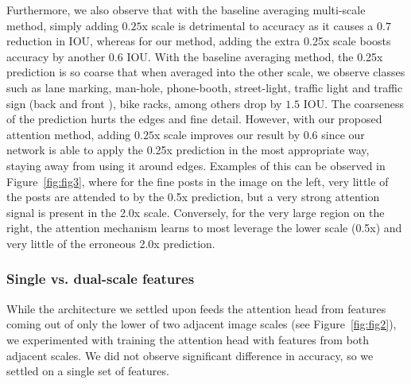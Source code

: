 \documentclass{article}
\begin{document}
Furthermore, we also observe that with the baseline averaging multi-scale method, simply adding $0.25$x scale is detrimental to accuracy as it causes a $0.7$ reduction in IOU, whereas for our method, adding the extra 0.25x scale boosts accuracy by another $0.6$ IOU. With the baseline averaging method, the 0.25x prediction is so coarse that when averaged into the other scale, we observe classes such as lane marking, man-hole, phone-booth, street-light, traffic light and traffic sign (back and front ), bike racks, among others drop by $1.5$ IOU. The coarseness of the prediction hurts the edges and fine detail. However, with our proposed attention method, adding $0.25$x scale improves our result by $0.6$ since our network is able to apply the 0.25x prediction in the most appropriate way, staying away from using it around edges. Examples of this can be observed in Figure~\ref{fig:fig3}, where for the fine posts in the image on the left, very little of the posts are attended to by the 0.5x prediction, but a very strong attention signal is present in the 2.0x scale. Conversely, for the very large region on the right, the attention mechanism learns to most leverage the lower scale (0.5x) and very little of the erroneous 2.0x prediction.

\subsubsection{Single vs. dual-scale features}
While the architecture we settled upon feeds the attention head from features coming out of only the lower of two adjacent image scales (see Figure~\ref{fig:fig2}), we experimented with training the attention head with features from both adjacent scales. We did not observe significant difference in accuracy, so we settled on a single set of features.
\end{document}
